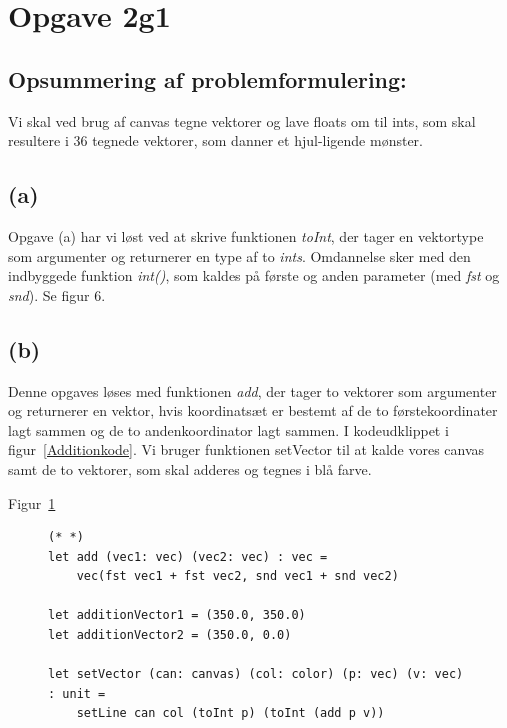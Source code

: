 \documentclass{article}
\begin{document}
\vspace{70mm}
\section{Opgave 2g1}

\subsection{Opsummering af problemformulering:}
Vi skal ved brug af canvas tegne vektorer og lave floats om til ints, som skal resultere i 36 tegnede vektorer, som danner et hjul-ligende mønster.

\subsection{(a)}
Opgave (a) har vi løst ved at skrive funktionen \emph{toInt}, der tager en vektortype som argumenter og returnerer en type af to \emph{ints}. Omdannelse sker med den indbyggede funktion \emph{int()}, som kaldes på første og anden parameter (med \emph{fst} og \emph{snd}). Se figur 6.

\subsection{(b)}
Denne opgaves løses med funktionen \emph{add}, der tager to vektorer som argumenter og returnerer en vektor, hvis koordinatsæt er bestemt af de to førstekoordinater lagt sammen og de to andenkoordinator lagt sammen. 
I kodeudklippet i figur~\ref{Additionkode}. 
Vi bruger funktionen setVector til at kalde vores canvas samt de to vektorer, som skal adderes og tegnes i blå farve. 

Figur~\ref{fig:fsharpCodeExample}
\begin{figure}
  \lstset{language=FSharp}
\begin{lstlisting}
(* *)
let add (vec1: vec) (vec2: vec) : vec =
    vec(fst vec1 + fst vec2, snd vec1 + snd vec2)

let additionVector1 = (350.0, 350.0)
let additionVector2 = (350.0, 0.0)

let setVector (can: canvas) (col: color) (p: vec) (v: vec) : unit =
    setLine can col (toInt p) (toInt (add p v))
\end{lstlisting}
  \caption{}
  \label{fig:fsharpCodeExample}
\end{figure}
\end{document}
